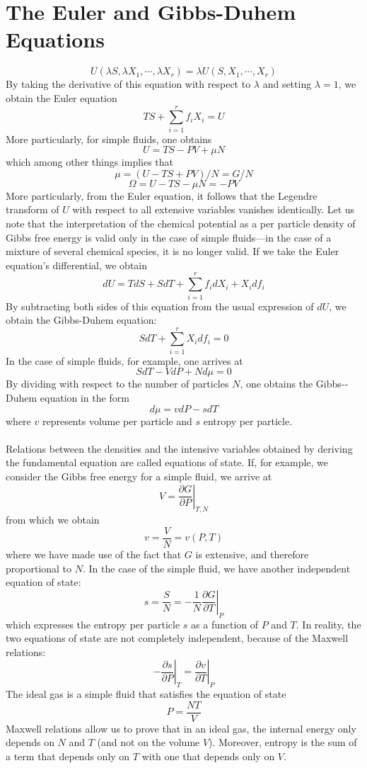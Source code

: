 \section{The Euler and Gibbs-­Duhem Equations}
\[U(\lambda S, \lambda X_1, \cdots, \lambda X_r) = \lambda U(S,X_1,\cdots,X_r)\]
By taking the derivative of this equation with respect to $\lambda$ and setting $\lambda = 1$, we obtain the Euler equation
\[TS + \sum_{i=1}^{r} f_i X_i = U\]
More particularly, for simple fluids, one obtains
\[U = TS - PV + \mu N\]
which among other things implies that
\[\mu = (U - TS + PV)/N = G/N\]
\[\Omega = U - TS - \mu N = -PV\]
More particularly, from the Euler equation, it follows that the Legendre transform of $U$ with respect to all extensive variables vanishes identically. Let us note that the interpretation of the chemical potential as a per particle density of Gibbs free energy is valid only in the case of simple fluids—in the case of a mixture of several chemical species, it is no longer valid.
If we take the Euler equation's differential, we obtain
\[dU = TdS + SdT + \sum_{i=1}^r f_idX_i + X_i df_i\]
By subtracting both sides of this equation from the usual expression of $dU$, we obtain the Gibbs-­Duhem equation:
\[SdT + \sum_{i=1}^{r}X_idf_i = 0\]
In the case of simple fluids, for example, one arrives at
\[SdT -VdP + Nd\mu = 0\]
By dividing with respect to the number of particles $N$, one obtains the Gibbs-­Duhem equation in the form
\[d\mu = vdP -sdT\]
where $v$ represents volume per particle and $s$ entropy per particle.
\\ \\
Relations between the densities and the intensive variables obtained by deriving the fundamental equation are called equations of state.
If, for example, we consider the Gibbs free energy for a simple fluid, we arrive at
\[ V = \left. \frac{\partial G}{\partial P} \right|_{T,N}\]
from which we obtain
\[v = \frac{V}{N} = v(P,T)\]
where we have made use of the fact that $G$ is extensive, and therefore proportional to $N$.
In the case of the simple fluid, we have another independent equation of state:
\[s = \frac{S}{N} = -\frac{1}{N}  \left. \frac{\partial G}{\partial T} \right|_{P}\]
which expresses the entropy per particle $s$ as a function of $P$ and $T$. In reality, the two equations of state are not completely independent, because of the Maxwell relations:
\[\left. -\frac{\partial s}{\partial P} \right|_{T} = \left. \frac{\partial v}{\partial T} \right|_{P}\]
The ideal gas is a simple fluid that satisfies the equation of state
\[P = \frac{NT}{V}\]
Maxwell relations allow us to prove that in an ideal gas, the internal energy only depends on $N$ and $T$ (and not on the volume $V$). Moreover, entropy is the sum of a term that depends only on $T$ with one that depends only
on $V$.

